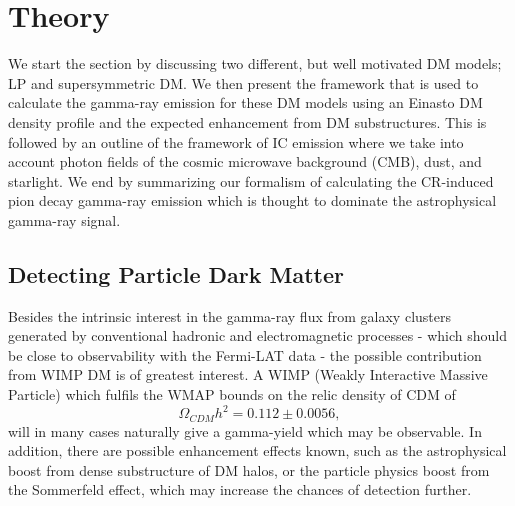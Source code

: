 \documentclass[10pt,aps,pra,reprint,amsmath,amsfonts,amssymb,showpacs,nofootinbib,floatfix]{revtex4-1}
\begin{document}
\section{Theory}
\label{sect:theory}
We start the section by discussing two different, but well motivated
DM models; LP and supersymmetric DM. We then present the framework
that is used to calculate the gamma-ray emission for these DM models
using an Einasto DM density profile and the expected enhancement from
DM substructures. This is followed by an outline of the framework of
IC emission where we take into account photon fields of the cosmic
microwave background (CMB), dust, and starlight. We end by summarizing
our formalism of calculating the CR-induced pion decay gamma-ray
emission which is thought to dominate the astrophysical gamma-ray
signal.


\subsection{Detecting Particle Dark Matter}
\label{sect:PF}
Besides the intrinsic interest in the gamma-ray flux from galaxy
clusters generated by conventional hadronic and electromagnetic
processes - which should be close to observability with the Fermi-LAT
data
\cite{1997ApJ...487..529B,2007A&A...473...41E,2010MNRAS.409..449P} -
the possible contribution from WIMP DM is of greatest interest. A WIMP
(Weakly Interactive Massive Particle) which fulfils the WMAP bounds on
the relic density of CDM of \cite{Komatsu:2010fb}
$$\Omega_{CDM}h^2=0.112\pm 0.0056,$$ will in many cases naturally give
a gamma-yield which may be observable. In addition, there are possible
enhancement effects known, such as the astrophysical boost from dense
substructure of DM halos, or the particle physics boost from the
Sommerfeld effect, which may increase the chances of detection
further.
\end{document}
